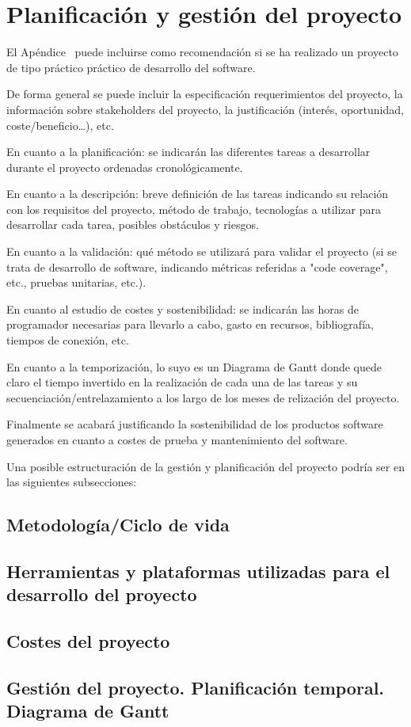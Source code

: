 \chapter{Planificación y gestión del proyecto}

El Apéndice \thechapter\  puede incluirse como recomendación si se ha realizado un proyecto de tipo práctico práctico de desarrollo del software.

De forma general se puede incluir la especificación requerimientos del proyecto, la información sobre stakeholders del proyecto, la justificación (interés, oportunidad, coste/beneficio…), etc.

En cuanto a la planificación: se indicarán las diferentes tareas a desarrollar durante el proyecto ordenadas cronológicamente.

En cuanto a la descripción: breve definición de las tareas indicando su relación con los requisitos del proyecto, método de trabajo, tecnologías a utilizar para desarrollar cada tarea, posibles obstáculos y riesgos.

En cuanto a la validación: qué método se utilizará para validar el proyecto (si se trata de desarrollo de software, indicando métricas referidas a "code coverage", etc., pruebas unitarias, etc.).

En cuanto al estudio de costes y sostenibilidad: se indicarán las horas de programador necesarias para llevarlo a cabo, gasto en recursos, bibliografía, tiempos de conexión, etc. 

En cuanto a la temporización, lo suyo es un Diagrama de Gantt donde quede claro el tiempo invertido en la realización de cada una de las tareas y su secuenciación/entrelazamiento a los largo de los meses de relización del proyecto.

Finalmente se acabará justificando la sostenibilidad de los productos software generados en cuanto a costes de prueba y mantenimiento del software.

Una posible estructuración  de la gestión y planificación del proyecto podría ser en las siguientes subsecciones:

\section{Metodología/Ciclo de vida} 

\section{Herramientas y plataformas utilizadas para el desarrollo del proyecto}

\section{Costes del proyecto}

\section{Gestión del proyecto. Planificación temporal. Diagrama de Gantt}


